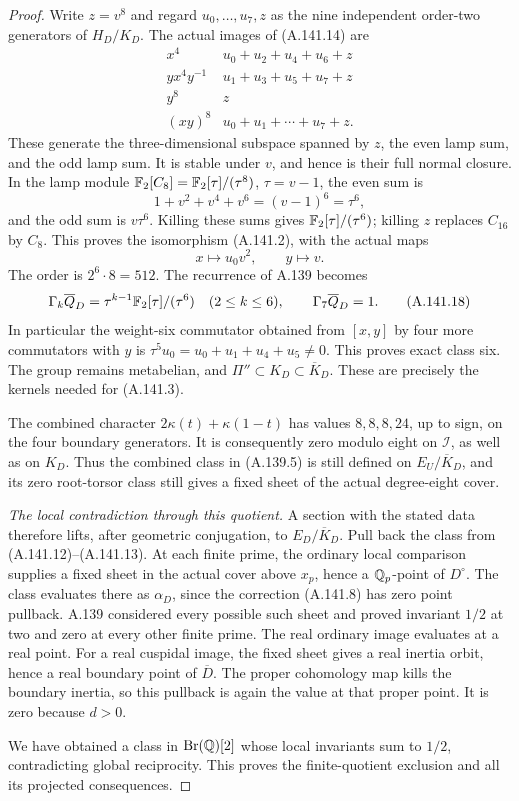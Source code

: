 \begin{proof}
Write \(z=v^8\) and regard \(u_0,\ldots,u_7,z\) as the nine
independent order-two generators of \(H_D/K_D\).
The actual images of (A.141.14) are
\[
 \begin{array}{c|c}
 x^4&u_0+u_2+u_4+u_6+z\\
 yx^4y^{-1}&u_1+u_3+u_5+u_7+z\\
 y^8&z\\
 (xy)^8&u_0+u_1+\cdots+u_7+z .
 \end{array}
\tag{A.141.15}
\]
These generate the three-dimensional subspace spanned by
\(z\), the even lamp sum, and the odd lamp sum.
It is stable under \(v\), and hence is their full normal closure.
In the lamp module \(\mathbb F_2[C_8]=\mathbb F_2[\tau]/(\tau^8)\),
\(\tau=v-1\), the even sum is
\[
             1+v^2+v^4+v^6=(v-1)^6=\tau^6,
\tag{A.141.16}
\]
and the odd sum is \(v\tau^6\).
Killing these sums gives \(\mathbb F_2[\tau]/(\tau^6)\);
killing \(z\) replaces \(C_{16}\) by \(C_8\).
This proves the isomorphism (A.141.2), with the actual maps
\[
                           x\longmapsto u_0v^2,\qquad
                           y\longmapsto v .
\tag{A.141.17}
\]
The order is \(2^6\cdot8=512\).
The recurrence of A.139 becomes
\[
 \Gamma_k\overline Q_D=\tau^{k-1}
                  \mathbb F_2[\tau]/(\tau^6)\quad(2\le k\le6),
                 \qquad \Gamma_7\overline Q_D=1 .
\tag{A.141.18}
\]
In particular the weight-six commutator obtained from \([x,y]\)
by four more commutators with \(y\) is
\(\tau^5u_0=u_0+u_1+u_4+u_5\ne0\).
This proves exact class six.
The group remains metabelian, and
\(\Pi''\subset K_D\subset\overline K_D\).
These are precisely the kernels needed for (A.141.3).

The combined character \(2\kappa(t)+\kappa(1-t)\) has values
\(8,8,8,24\), up to sign, on the four boundary generators.
It is consequently zero modulo eight on \(\mathcal I\),
as well as on \(K_D\).  Thus the combined class in (A.139.5)
is still defined on \(E_U/\overline K_D\), and its zero
root-torsor class still gives a fixed sheet of the actual
degree-eight cover.

\emph{The local contradiction through this quotient.}
A section with the stated data therefore lifts, after geometric
conjugation, to \(E_D/\overline K_D\).
Pull back the class from (A.141.12)--(A.141.13).
At each finite prime, the ordinary local comparison supplies a
fixed sheet in the actual cover above \(x_p\), hence a
\(\mathbb Q_p\)-point of \(D^\circ\).  The class evaluates there as
\(\alpha_D\), since the correction (A.141.8) has zero point
pullback.  A.139 considered every possible such sheet and proved
invariant \(1/2\) at two and zero at every other finite prime.
The real ordinary image evaluates at a real point.
For a real cuspidal image, the fixed sheet gives a real inertia
orbit, hence a real boundary point of \(\overline D\).
The proper cohomology map kills the boundary inertia, so this
pullback is again the value at that proper point.
It is zero because \(d>0\).

We have obtained a class in \(\operatorname{Br}(\mathbb Q)[2]\)
whose local invariants sum to \(1/2\), contradicting global
reciprocity.  This proves the finite-quotient exclusion and all
its projected consequences.
\end{proof}

